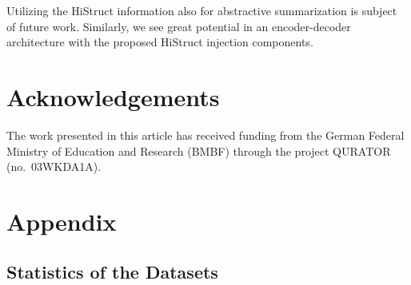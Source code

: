\documentclass[11pt]{article}
\begin{document}
Utilizing the HiStruct information also for abstractive summarization is subject of future work.
Similarly, we see great potential in an encoder-decoder architecture with the proposed HiStruct injection components.








\section*{Acknowledgements}
The work presented in this article has received funding from the German Federal Ministry of Education and Research (BMBF) through the project QURATOR (no.~03WKDA1A).

\clearpage


\clearpage

\appendix

\section{Appendix}
\label{sec:appendix}


\subsection{Statistics of the Datasets}
\label{subsec:Statistics of the datasets}
\end{document}
